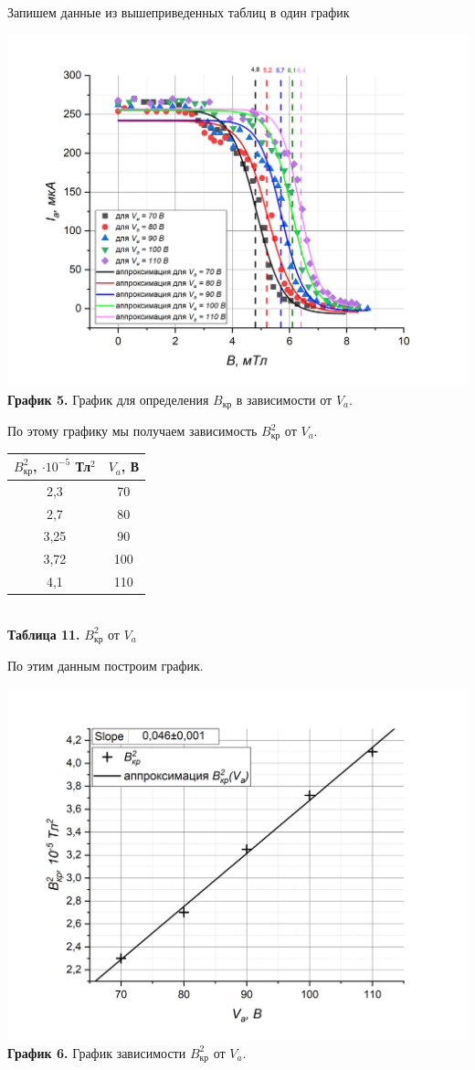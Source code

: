 \documentclass[a4paper, 12pt]{article}%
\begin{document}
\newpage
Запишем данные из вышеприведенных таблиц в один график
\begin{center}
\includegraphics[width = \textwidth]{7.jpg}\\
\textbf{График 5. } График для определения $B_{\text{кр}}$ в зависимости от $V_a$.
\end{center}
По этому графику мы получаем зависимость $B_{\text{кр}}^2$ от $V_a$.
\begin{center}
\begin{tabular}{|c|c|}
\hline
$B_{\text{кр}}^2$, $\cdot 10^{-5}$ Тл$^2$ & $V_a$, В \\ \hline
2,3 & 70 \\ \hline
2,7 & 80 \\ \hline
3,25 & 90 \\ \hline
3,72 & 100 \\ \hline
4,1 & 110 \\ \hline
\end{tabular}\\
\textbf{Таблица 11.} $B_{\text{кр}}^2$ от $V_a$
\end{center}
По этим данным построим график.
\begin{center}
\includegraphics[width = \textwidth]{8.jpg}\\
\textbf{График 6. } График зависимости $B_{\text{кр}}^2$ от $V_a$.
\end{center}
\end{document}
